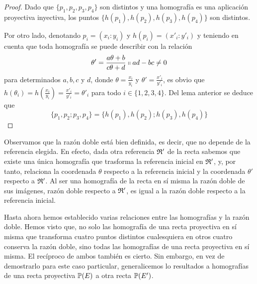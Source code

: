 \begin{proof}
	Dado que $\{p_1,p_2,p_3,p_4\}$ son distintos y una homografía es una aplicación proyectiva inyectiva, los puntos $\{h(p_1),h(p_2),h(p_3),h(p_4)\}$ son distintos.
	
	Por otro lado, denotando $p_i=(x_i:y_i)$ y $h(p_i)=(x'_i:y'_i)$ y teniendo en cuenta que toda homografía se puede describir con la relación
	\begin{equation*}
		\theta'=\frac{a\theta+b}{c\theta +d}\shortparallel ad-bc\not=0
	\end{equation*}
	para determinados $a,b,c$ y $d$, donde $\theta=\frac{x_i}{y_i}$ y $\theta'=\frac{x'_i}{y'_i}$, es obvio que $h(\theta_i)=h(\frac{x_i}{y_i})=\frac{x'_i}{y'_i}=\theta'_i$ para todo $i\in\{1,2,3,4\}$. Del lema anterior se deduce que
	\begin{equation*}
		\{p_1,p_2;p_3,p_4\}=\{h(p_1),h(p_2);h(p_3),h(p_4)\}
	\end{equation*}
\end{proof}
\begin{obs}
	Observamos que la razón doble está bien definida, es decir, que no depende de la referencia elegida. En efecto, dada otra referencia $\mathfrak{R}'$ de la recta sabemos que existe una única homografía que trasforma la referencia inicial en $\mathfrak{R}'$, y, por tanto, relaciona la coordenada $\theta$ respecto a la referencia inicial y la coordenada $\theta'$ respecto a $\mathfrak{R}'$. Al ser una homografía de la recta en sí misma la razón doble de sus imágenes, razón doble respecto a $\mathfrak{R}'$, es igual a la razón doble respecto a la referencia inicial.
\end{obs}
Hasta ahora hemos establecido varias relaciones entre las homografías y la razón doble. Hemos visto que, no solo las homografía de una recta proyectiva en sí misma que transforma cuatro puntos distintos cualesquiera en otros cuatro conserva la razón doble, sino todas las homografías de una recta proyectiva en sí misma. El recíproco de ambos también es cierto. Sin embargo, en vez de demostrarlo para este caso particular, generalicemos lo resultados a homografías de una recta proyectiva $\mathbb{P}(E)$ a otra recta $\mathbb{P}(E')$.

